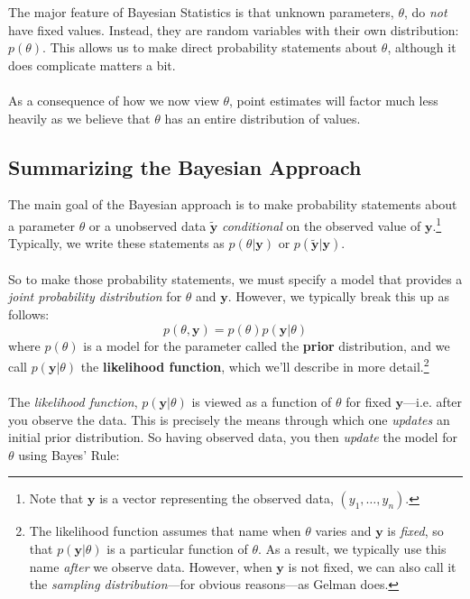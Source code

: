 \documentclass[a4paper,12pt]{scrartcl}
\begin{document}
The major feature of Bayesian Statistics is that unknown parameters,
$\theta$, do \emph{not} have fixed values. Instead, they are random 
variables with their own distribution: $p(\theta)$. This allows us
to make direct probability statements about $\theta$, although it
does complicate matters a bit.
\\
\\
As a consequence of how we now view $\theta$, point estimates will
factor much less heavily as we believe that $\theta$ has an entire
distribution of values.

\subsection{Summarizing the Bayesian Approach}

The main goal of the Bayesian approach is to make probability statements
about a parameter $\theta$ or a unobserved data $\tilde{\mathbf{y}}$ 
\emph{conditional} on the observed value of $\mathbf{y}$.\footnote{Note 
that $\mathbf{y}$ is a vector representing the observed
data, $(y_1, \ldots, y_n)$.} Typically, we write these statements
as $p(\theta| \mathbf{y})$ or  $p(\tilde{\mathbf{y}}| \mathbf{y})$.
\\
\\
So to make those probability statements, we must specify a model that
provides a \emph{joint probability distribution} for $\theta$ and
$\mathbf{y}$. However, we typically break this up as follows:
   \[ p(\theta, \textbf{y}) = p(\theta) p(\mathbf{y} | \theta) \]
where $p(\theta)$ is a model for the parameter called the \textbf{prior}
distribution, and we call $p(\mathbf{y} | \theta)$ the \textbf{likelihood
function}, which we'll describe in more detail.\footnote{The 
   likelihood function assumes that name when $\theta$ varies and
   $\textbf{y}$ is \emph{fixed}, so that $p(\mathbf{y} | \theta)$ is
   a particular function of $\theta$.  As a result, we typically use 
   this name \emph{after} we observe data.  However, 
   when $\mathbf{y}$ is not fixed, we can also call it the 
   \emph{sampling distribution}---for obvious reasons---as Gelman does.}
\\
\\
The \emph{likelihood function}, $p(\mathbf{y} | \theta)$ is viewed
as a function of $\theta$ for fixed $\mathbf{y}$---i.e. after you observe
the data.  This is precisely the means through which one \emph{updates}
an initial prior distribution. So having observed data, 
you then \emph{update} the model for $\theta$ using Bayes' Rule:
\end{document}
